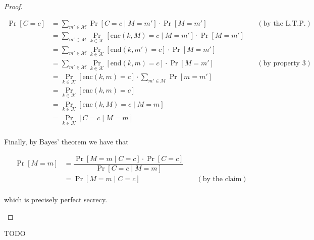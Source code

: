 \documentclass[a4paper, 12pt]{report}
\begin{document}
\begin{proof}
\begin{itemize}
{			      \begin{equation*}
				      \begin{alignedat}{2}
					      \Pr[C = c] & = \sum_{m' \in \mathcal M}{\Pr[C = c \mid M = m'] \cdot \Pr[M = m']}                                     & \quad (\mbox{by the L.T.P.}) \\
					                 & = \sum_{m' \in \mathcal M}{\Pr_{k \in \mathcal K}[\mathrm{enc}(k, M) = c \mid M = m'] \cdot \Pr[M = m']} &                              \\
					                 & = \sum_{m' \in \mathcal M}{\Pr_{k \in \mathcal K}[\mathrm{end}(k, m') = c] \cdot \Pr[M = m']}            &                              \\
					                 & = \sum_{m' \in \mathcal M}{\Pr_{k \in \mathcal K}[\mathrm{end}(k, m) = c] \cdot \Pr[M = m']}             & \quad (\mbox{by property 3}) \\
					                 & = \Pr_{k \in \mathcal K}[\mathrm{enc}(k, m) = c] \cdot \sum_{m' \in \mathcal M}{\Pr[m = m']}             &                              \\
					                 & = \Pr_{k \in \mathcal K}[\mathrm{enc}(k, m) = c]                                                         &                              \\
					                 & = \Pr_{k \in \mathcal K}[\mathrm{enc}(k, M) = c \mid M = m]                                              &                              \\
					                 & = \Pr_{k \in \mathcal K}[C = c \mid M = m]                                                               &                              \\
				      \end{alignedat}
			      \end{equation*}
		      }

		      Finally, by Bayes' theorem we have that

		      \begin{equation*}
			      \begin{alignedat}{2}
				      \Pr[M = m] & = \dfrac{\Pr[M = m \mid C = c] \cdot \Pr[C = c]}{\Pr[C = c \mid M = m]} &                             \\
				                 & = \Pr[M = m \mid C = c]                                                 & \quad (\mbox{by the claim}) \\
			      \end{alignedat}
		      \end{equation*}

		      which is precisely perfect secrecy.
	\end{itemize}
\end{proof}

TODO 

\end{document}
